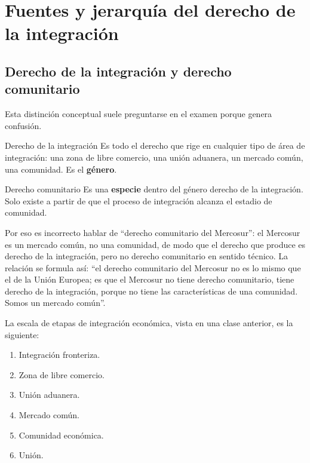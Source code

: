 \documentclass[12pt,oneside]{book}
\begin{document}
\chapter[Fuentes y jerarquía]{Fuentes y jerarquía del derecho de la integración}\label{cap:fuentes}

\section{Derecho de la integración y derecho comunitario}

Esta distinción conceptual suele preguntarse en el examen porque genera confusión.

\begin{definition}{Derecho de la integración}
Es todo el derecho que rige en cualquier tipo de área de integración: una zona de libre comercio, una unión aduanera, un mercado común, una comunidad. Es el \textbf{género}.
\end{definition}

\begin{definition}{Derecho comunitario}
Es una \textbf{especie} dentro del género derecho de la integración. Solo existe a partir de que el proceso de integración alcanza el estadio de comunidad.
\end{definition}

Por eso es incorrecto hablar de “derecho comunitario del Mercosur”: el Mercosur es un mercado común, no una comunidad, de modo que el derecho que produce es derecho de la integración, pero no derecho comunitario en sentido técnico. La relación se formula así: “el derecho comunitario del Mercosur no es lo mismo que el de la Unión Europea; es que el Mercosur no tiene derecho comunitario, tiene derecho de la integración, porque no tiene las características de una comunidad. Somos un mercado común”.

La escala de etapas de integración económica, vista en una clase anterior, es la siguiente:

\begin{enumerate}
    \item Integración fronteriza.
    \item Zona de libre comercio.
    \item Unión aduanera.
    \item Mercado común.
    \item Comunidad económica.
    \item Unión.
\end{enumerate}
\end{document}
